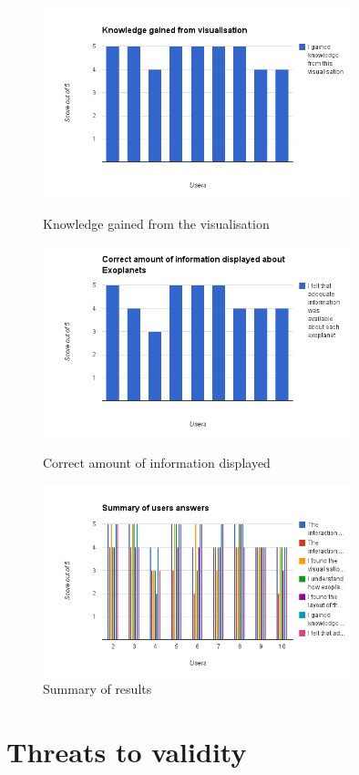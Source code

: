 \begin{figure}[h!]
  \centering
      \includegraphics[width=0.8\textwidth]{images/charts/chart_7.png}
  \caption{Knowledge gained from the visualisation}  
    \label{fig:chart7}

      \includegraphics[width=0.8\textwidth]{images/charts/chart_8.png}
  \caption{Correct amount of information displayed}  
    \label{fig:chart8}
      \includegraphics[width=0.8\textwidth]{images/charts/chart_9.png}
  \caption{Summary of results}  
    \label{fig:chart9}
    
\end{figure}
\section{Threats to validity}
